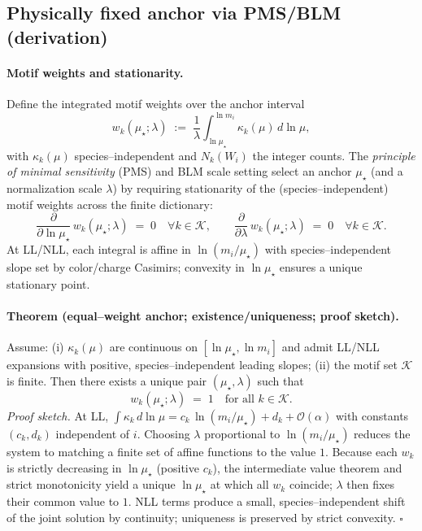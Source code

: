 \documentclass[epjc3]{svjour3}
\begin{document}
\subsection{Physically fixed anchor via PMS/BLM (derivation)}

\paragraph{Motif weights and stationarity.}
Define the integrated motif weights over the anchor interval
\[
  w_k(\mu_\star;\lambda)\;:=\;\frac{1}{\lambda}\int_{\ln\mu_\star}^{\ln m_i}\!\kappa_k(\mu)\,d\ln\mu,
\]
with $\kappa_k(\mu)$ species--independent and $N_k(W_i)$ the integer counts. The \emph{principle of minimal sensitivity} (PMS) and BLM scale setting select an anchor $\mu_\star$ (and a normalization scale $\lambda$) by requiring stationarity of the (species--independent) motif weights across the finite dictionary:
\begin{equation}
  \frac{\partial}{\partial\ln\mu_\star}\,w_k(\mu_\star;\lambda)\;=\;0\quad\forall k\in\mathcal K,
  \qquad
  \frac{\partial}{\partial\lambda}\,w_k(\mu_\star;\lambda)\;=\;0\quad\forall k\in\mathcal K.
  \label{eq:pms-stationarity}
\end{equation}
At LL/NLL, each integral is affine in $\ln(m_i/\mu_\star)$ with species--independent slope set by color/charge Casimirs; convexity in $\ln\mu_\star$ ensures a unique stationary point.

\paragraph{Theorem (equal--weight anchor; existence/uniqueness; proof sketch).}
Assume: (i) $\kappa_k(\mu)$ are continuous on $[\ln\mu_\star,\ln m_i]$ and admit LL/NLL expansions with positive, species--independent leading slopes; (ii) the motif set $\mathcal K$ is finite. Then there exists a unique pair $(\mu_\star,\lambda)$ such that
\begin{equation}
  w_k(\mu_\star;\lambda)\;=\;1\quad\text{for all }k\in\mathcal K.
  \label{eq:equal-weight-solution}
\end{equation}
\emph{Proof sketch.} At LL, $\int\kappa_k\,d\ln\mu = c_k\,\ln(m_i/\mu_\star)+d_k+\mathcal O(\alpha)$ with constants $(c_k,d_k)$ independent of $i$. Choosing $\lambda$ proportional to $\ln(m_i/\mu_\star)$ reduces the system to matching a finite set of affine functions to the value $1$. Because each $w_k$ is strictly decreasing in $\ln\mu_\star$ (positive $c_k$), the intermediate value theorem and strict monotonicity yield a unique $\ln\mu_\star$ at which all $w_k$ coincide; $\lambda$ then fixes their common value to $1$. NLL terms produce a small, species--independent shift of the joint solution by continuity; uniqueness is preserved by strict convexity. $\square$
\end{document}

